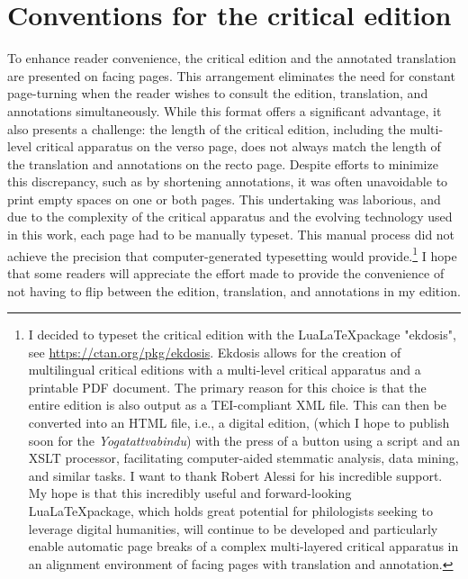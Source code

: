 

\section{Conventions for the critical edition}

To enhance reader convenience, the critical edition and the annotated translation are presented on facing pages. This arrangement eliminates the need for constant page-turning when the reader wishes to consult the edition, translation, and annotations simultaneously. While this format offers a significant advantage, it also presents a challenge: the length of the critical edition, including the multi-level critical apparatus on the verso page, does not always match the length of the translation and annotations on the recto page. Despite efforts to minimize this discrepancy, such as by shortening annotations, it was often unavoidable to print empty spaces on one or both pages. This undertaking was laborious, and due to the complexity of the critical apparatus and the evolving technology used in this work, each page had to be manually typeset. This manual process did not achieve the precision that computer-generated typesetting would provide.\footnote{I decided to typeset the critical edition with the Lua\LaTeX package "ekdosis", see \url{https://ctan.org/pkg/ekdosis}. Ekdosis allows for the creation of multilingual critical editions with a multi-level critical apparatus and a printable PDF document. The primary reason for this choice is that the entire edition is also output as a TEI-compliant XML file. This can then be converted into an HTML file, i.e., a digital edition, (which I hope to publish soon for the \emph{Yogatattvabindu}) with the press of a button using a script and an XSLT processor, facilitating computer-aided stemmatic analysis, data mining, and similar tasks. I want to thank Robert Alessi for his incredible support. My hope is that this incredibly useful and forward-looking Lua\LaTeX package, which holds great potential for philologists seeking to leverage digital humanities, will continue to be developed and particularly enable automatic page breaks of a complex multi-layered critical apparatus in an alignment environment of facing pages with translation and annotation.} I hope that some readers will appreciate the effort made to provide the convenience of not having to flip between the edition, translation, and annotations in my edition.

